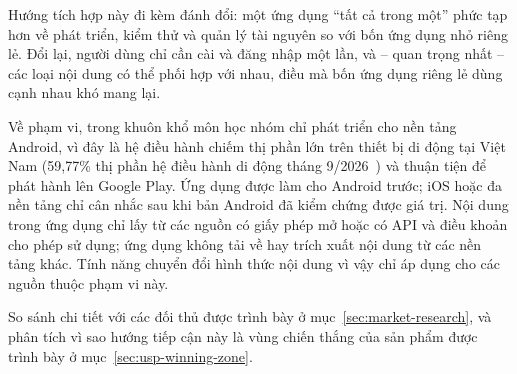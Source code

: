Hướng tích hợp này đi kèm đánh đổi: một ứng dụng ``tất cả trong một'' phức tạp hơn về phát triển, kiểm thử và quản lý tài nguyên so với bốn ứng dụng nhỏ riêng lẻ. Đổi lại, người dùng chỉ cần cài và đăng nhập một lần, và -- quan trọng nhất -- các loại nội dung có thể phối hợp với nhau, điều mà bốn ứng dụng riêng lẻ dùng cạnh nhau khó mang lại.

Về phạm vi, trong khuôn khổ môn học nhóm chỉ phát triển cho nền tảng Android, vì đây là hệ điều hành chiếm thị phần lớn trên thiết bị di động tại Việt Nam (59,77\% thị phần hệ điều hành di động tháng 9/2026~\cite{statcounter-vn}) và thuận tiện để phát hành lên Google Play. Ứng dụng được làm cho Android trước; iOS hoặc đa nền tảng chỉ cân nhắc sau khi bản Android đã kiểm chứng được giá trị.
Nội dung trong ứng dụng chỉ lấy từ các nguồn có giấy phép mở hoặc có API và điều khoản cho phép sử dụng; ứng dụng không tải về hay trích xuất nội dung từ các nền tảng khác. Tính năng chuyển đổi hình thức nội dung vì vậy chỉ áp dụng cho các nguồn thuộc phạm vi này.

So sánh chi tiết với các đối thủ được trình bày ở mục~\ref{sec:market-research}, và phân tích vì sao hướng tiếp cận này là vùng chiến thắng của sản phẩm được trình bày ở mục~\ref{sec:usp-winning-zone}.